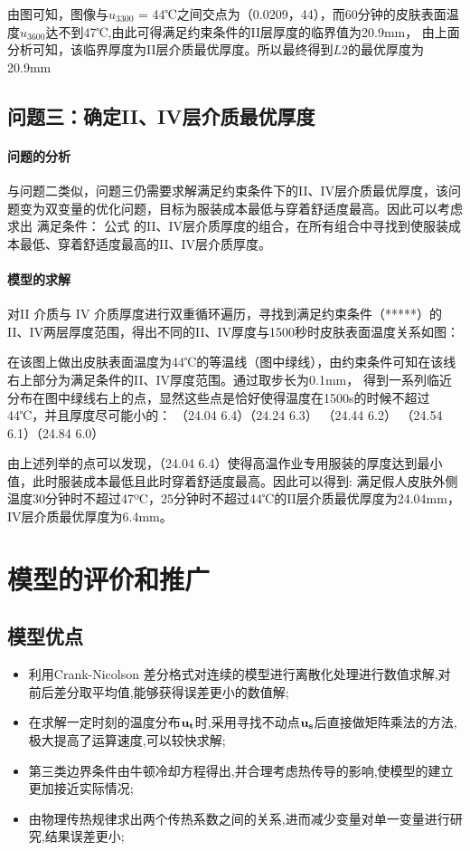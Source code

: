 \documentclass{cumcmthesis}
\begin{document}
    由图可知，图像与\(u_{3300}\) = 44℃之间交点为（0.0209，44），而60分钟的皮肤表面温度\(u_{3600}\)达不到47℃,由此可得满足约束条件的II层厚度的临界值为20.9mm，
    由上面分析可知，该临界厚度为II层介质最优厚度。所以最终得到\(L2\)的最优厚度为20.9mm


     \subsection{问题三：确定II、IV层介质最优厚度} 
        \paragraph{问题的分析} 
        与问题二类似，问题三仍需要求解满足约束条件下的II、IV层介质最优厚度，该问题变为双变量的优化问题，目标为服装成本最低与穿着舒适度最高。因此可以考虑求出
    满足条件：
                            公式
    的II、IV层介质厚度的组合，在所有组合中寻找到使服装成本最低、穿着舒适度最高的II、IV层介质厚度。
        \paragraph{模型的求解} 
          
        对II 介质与 IV 介质厚度进行双重循环遍历，寻找到满足约束条件（*****）的II、IV两层厚度范围，得出不同的II、IV厚度与1500秒时皮肤表面温度关系如图：
     

        在该图上做出皮肤表面温度为44℃的等温线（图中绿线），由约束条件可知在该线右上部分为满足条件的II、IV厚度范围。通过取步长为0.1mm，
        得到一系列临近分布在图中绿线右上的点，显然这些点是恰好使得温度在1500s的时候不超过44℃，并且厚度尽可能小的：
        （24.04 6.4）（24.24 6.3） （24.44 6.2） （24.54 6.1）（24.84 6.0）
    
        由上述列举的点可以发现，（24.04 6.4）使得高温作业专用服装的厚度达到最小值，此时服装成本最低且此时穿着舒适度最高。因此可以得到:
        满足假人皮肤外侧温度30分钟时不超过47ºC，25分钟时不超过44℃的II层介质最优厚度为24.04mm，IV层介质最优厚度为6.4mm。
    
\section{模型的评价和推广}
    \subsection{模型优点} 
        \begin{itemize}
            \item 利用Crank-Nicolson 差分格式对连续的模型进行离散化处理进行数值求解,对前后差分取平均值,能够获得误差更小的数值解;
            \item 在求解一定时刻的温度分布\(\bf{u}_t\)时,采用寻找不动点\(\bf{u}_s\)后直接做矩阵乘法的方法,极大提高了运算速度,可以较快求解;
            \item 第三类边界条件由牛顿冷却方程得出,并合理考虑热传导的影响,使模型的建立更加接近实际情况;
            \item 由物理传热规律求出两个传热系数之间的关系,进而减少变量对单一变量进行研究,结果误差更小;
        \end{itemize}
\end{document}
